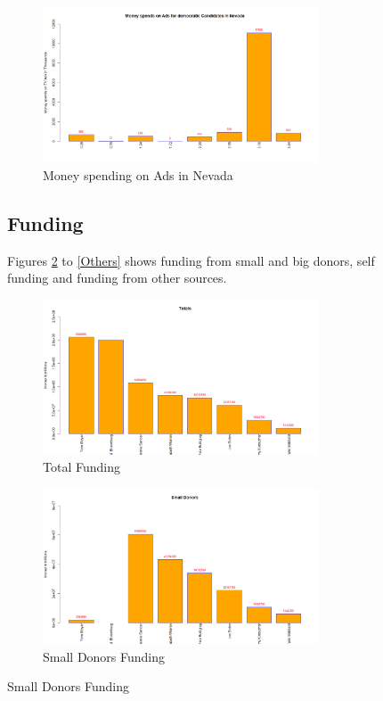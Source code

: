 \begin{figure}[H]
\begin{figure}[H]
    \centering
    \includegraphics[width=0.9\textwidth]{figures/Nevada.png}
    \caption{Money spending on Ads in Nevada}
    \label{Nevada}
\end{figure}

\subsection{Funding}
Figures \ref{Total} to \ref{Others} shows funding from small and big donors,  self funding and funding from other sources.  
\begin{figure}[H]
    \centering
    \includegraphics[width=0.9\textwidth]{figures/Total.png}
    \caption{Total Funding}
    \label{Total}
\end{figure}

\begin{figure}[H]
    \centering
    \includegraphics[width=0.9\textwidth]{figures/Small Donors.png}
    \caption{Small Donors Funding}
    \label{Small Donors}
\end{figure}


\end{figure}
